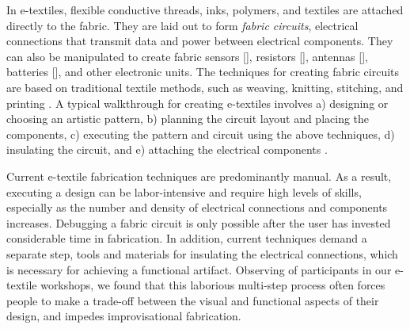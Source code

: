 \documentclass[header.tex]{subfiles}
\begin{document}
In e-textiles, flexible conductive threads, inks, polymers, and  textiles are attached directly to the fabric. They are laid out to form \textit{fabric circuits}, electrical connections that transmit data and power between electrical components. 
They can also be manipulated to create fabric sensors [], resistors [], antennas [], batteries [], and other electronic units. The techniques for creating fabric circuits are based on traditional textile methods, such as weaving, knitting, stitching, and printing \cite{castano2014smart}. A typical walkthrough for creating e-textiles involves a) designing or choosing an artistic pattern, b) planning the circuit layout and placing the components, c) executing the pattern and circuit using the above techniques, d) insulating the circuit, and e) attaching the electrical components \cite{Buechley2009}.






Current e-textile fabrication techniques are predominantly manual. As a result, executing a design can be labor-intensive and require high levels of skills, especially as the number and density of electrical connections and components increases. Debugging a fabric circuit is only possible after the user has invested considerable time in fabrication. In addition, current techniques demand a separate step, tools and materials for insulating the electrical connections, which is necessary for achieving a functional artifact. %
Observing of participants in our e-textile workshops, we found that this laborious multi-step process often forces people to make a trade-off between the visual and functional aspects of their design, and impedes improvisational fabrication. %


\end{document}
